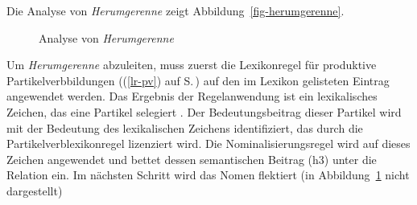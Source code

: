 %
\noindent
Die Analyse von \emph{Herumgerenne} zeigt Abbildung~\vref{fig-herumgerenne}.
\begin{figure}
\caption{Analyse von \emph{Herumgerenne}}\label{fig-herumgerenne}
\end{figure}
%
Um \emph{Herumgerenne} abzuleiten, muss zuerst die Lexikonregel für produktive Partikelverbbildungen
((\ref{lr-pv}) auf S.\,\pageref{lr-pv}) auf den im Lexikon gelisteten Eintrag  angewendet
werden. Das Ergebnis der Regelanwendung ist ein lexikalisches Zeichen,
das eine Partikel selegiert .
Der Bedeutungsbeitrag dieser Partikel  wird mit der Bedeutung
des lexikalischen Zeichens identifiziert, das durch die Partikelverblexikonregel
lizenziert wird. Die Nominalisierungsregel wird auf dieses Zeichen angewendet
und bettet dessen semantischen Beitrag (h3) unter die Relation  ein.
Im nächsten Schritt wird das Nomen flektiert (in Abbildung~\ref{fig-herumgerenne} nicht dargestellt)

